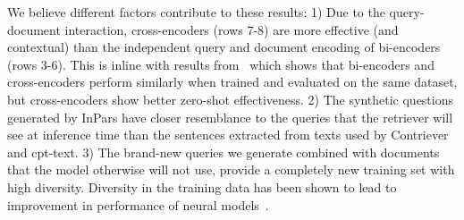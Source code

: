 \documentclass[11pt]{article}
\begin{document}
We believe different factors contribute to these results:
1) Due to the query-document interaction, cross-encoders (rows 7-8) are more effective (and contextual) than the independent query and document encoding of bi-encoders (rows 3-6). This is inline with results from~\citet{thakur2021beir} which shows that bi-encoders and cross-encoders perform similarly when trained and evaluated on the same dataset, but cross-encoders show better zero-shot effectiveness. 2) The synthetic questions generated by InPars have closer resemblance to the queries that the retriever will see at inference time than the sentences extracted from texts used by Contriever and cpt-text.
3) The brand-new queries we generate combined with documents that the model otherwise will not use, provide a completely new training set with high diversity. Diversity in the training data has been shown to lead to improvement in performance of neural models~\cite{qu2021coda}.

\begin{table}
\centering\centering{}
\caption{Ablation: Few-shot results when using different input documents and prompts to generate questions.}
\label{tab:prompt_ablation}
\end{table}
\end{document}
